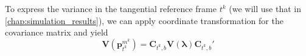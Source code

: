 To express the variance in the tangential reference frame $t^k$ (we will use that in \cref{chap:simulation_results}), we can apply coordinate transformation for the covariance matrix and yield
\begin{equation}
\label{eq:variance_coordinates_tangential}
\mathbf{V} (\mathbf{p}^{m^k}_{t^k}) = 
\mathbf{C}_{t^k,b}
\mathbf{V}(\boldsymbol{\lambda})
\mathbf{C}_{t^k,b}'
\end{equation}
